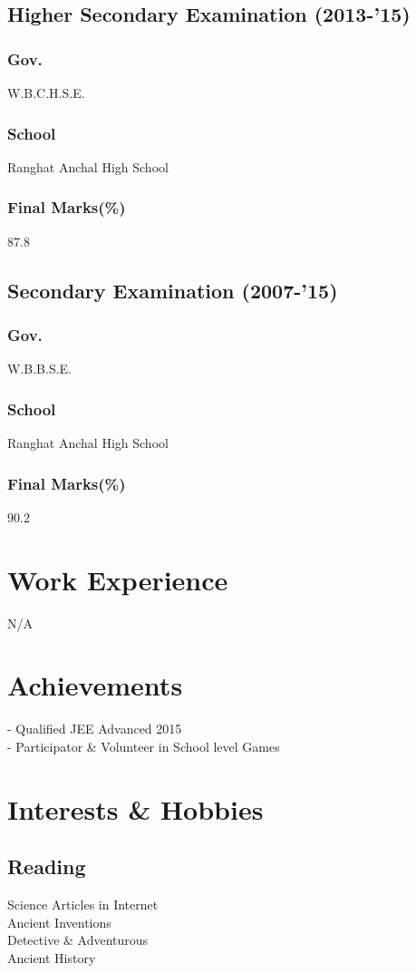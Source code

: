 \documentclass{article}
\begin{document}
\subsection{Higher Secondary Examination (2013-'15)}
\subsubsection{Gov.}	W.B.C.H.S.E.
\subsubsection{School}	Ranghat Anchal High School
\subsubsection{Final Marks(\%)}	87.8

\subsection{Secondary Examination (2007-'15)}
\subsubsection{Gov.}	W.B.B.S.E.
\subsubsection{School}	Ranghat Anchal High School
\subsubsection{Final Marks(\%)}	90.2

\section{Work Experience}
N/A

\section{Achievements}
- Qualified JEE Advanced 2015\\
- Participator \& Volunteer in School level Games

\section{Interests \& Hobbies}
\subsection{Reading}
Science Articles in Internet\\
Ancient Inventions\\
Detective \& Adventurous\\
Ancient History
\end{document}
